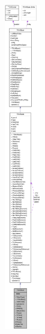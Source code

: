 \begin{figure}[H]
\begin{center}
\leavevmode
\includegraphics[height=400pt]{class_ti_xml_text__coll__graph}
\end{center}
\end{figure}
